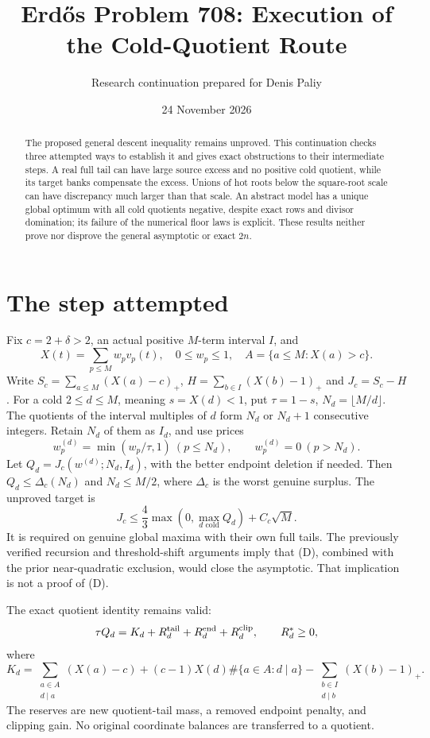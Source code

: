 \documentclass[11pt]{article}
\title{Erd\H{o}s Problem 708: Execution of the Cold-Quotient Route}
\author{Research continuation prepared for Denis Paliy}
\date{24 November 2026}
\begin{document}
\maketitle
\begin{abstract}
The proposed general descent inequality remains unproved. This continuation
checks three attempted ways to establish it and gives exact obstructions to
their intermediate steps. A real full tail can have large source excess and
no positive cold quotient, while its target banks compensate the excess.
Unions of hot roots below the square-root scale can have discrepancy much
larger than that scale. An abstract model has a unique global optimum with
all cold quotients negative, despite exact rows and divisor domination; its
failure of the numerical floor laws is explicit. These results neither prove
nor disprove the general asymptotic or exact $2n$.
\end{abstract}

\section{The step attempted}
Fix $c=2+\delta>2$, an actual positive $M$-term interval $I$, and
\[
 X(t)=\sum_{p\le M}w_pv_p(t),\quad0\le w_p\le1,
 \quad A=\{a\le M:X(a)>c\}.
\]
Write $S_c=\sum_{a\le M}(X(a)-c)_+$,
$H=\sum_{b\in I}(X(b)-1)_+$ and $J_c=S_c-H$.
For a cold $2\le d\le M$, meaning $s=X(d)<1$, put $\tau=1-s$,
$N_d=\lfloor M/d\rfloor$. The quotients of the interval multiples of $d$
form $N_d$ or $N_d+1$ consecutive integers. Retain $N_d$ of them as $I_d$,
and use prices
\[
 w_p^{(d)}=\min(w_p/\tau,1)\ (p\le N_d),\qquad w_p^{(d)}=0\ (p>N_d).
\]
Let $Q_d=J_c(w^{(d)};N_d,I_d)$, with the better endpoint deletion if
needed. Then $Q_d\le\Delta_c(N_d)$ and $N_d\le M/2$, where $\Delta_c$
is the worst genuine surplus. The unproved target is
\[
 \boxed{J_c\le\frac43\max\left(0,\max_{d\text{ cold}}Q_d\right)
                      +C_c\sqrt M.}\tag{D}
\]
It is required on genuine global maxima with their own full tails.
The previously verified recursion and threshold-shift arguments imply
that (D), combined with the prior near-quadratic exclusion, would close
the asymptotic. That implication is not a proof of (D).

The exact quotient identity remains valid:
\[
 \tau Q_d=K_d+R_d^{\rm tail}+R_d^{\rm end}+R_d^{\rm clip},\qquad R_d^*\ge0,
\]
where
\[
 K_d=\sum_{\substack{a\in A\\d\mid a}}(X(a)-c)
 +(c-1)X(d)\#\{a\in A:d\mid a\}
 -\sum_{\substack{b\in I\\d\mid b}}(X(b)-1)_+.
\]
The reserves are new quotient-tail mass, a removed endpoint penalty, and
clipping gain. No original coordinate balances are transferred to a quotient.
\end{document}
